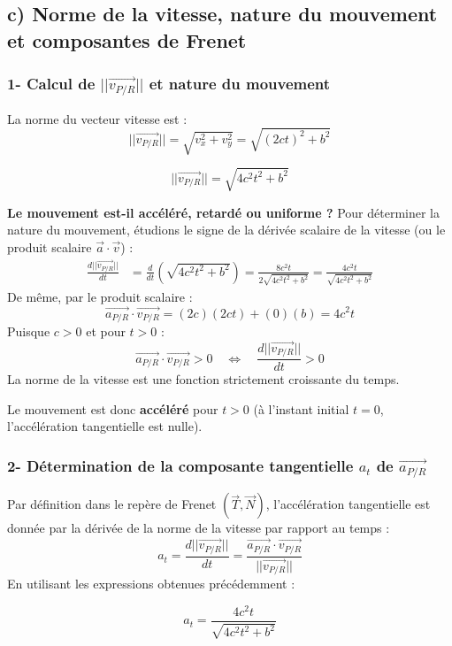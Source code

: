 \documentclass[11pt,a4paper]{article}
\begin{document}
\subsection*{c) Norme de la vitesse, nature du mouvement et composantes de Frenet}

\subsubsection*{1- Calcul de $||\vec{v_{P/R}}||$ et nature du mouvement}
La norme du vecteur vitesse est :
$$ ||\vec{v_{P/R}}|| = \sqrt{v_x^2 + v_y^2} = \sqrt{(2ct)^2 + b^2} $$
\begin{sonucbox}
$$ ||\vec{v_{P/R}}|| = \sqrt{4c^2 t^2 + b^2} $$
\end{sonucbox}

\textbf{Le mouvement est-il accéléré, retardé ou uniforme ?}
Pour déterminer la nature du mouvement, étudions le signe de la dérivée scalaire de la vitesse (ou le produit scalaire $\vec{a}\cdot\vec{v}$) :
\begin{align*}
\frac{d||\vec{v_{P/R}}||}{dt} &= \frac{d}{dt}\left(\sqrt{4c^2 t^2 + b^2}\right) = \frac{8c^2 t}{2\sqrt{4c^2 t^2 + b^2}} = \frac{4c^2 t}{\sqrt{4c^2 t^2 + b^2}}
\end{align*}
De même, par le produit scalaire :
$$ \vec{a_{P/R}} \cdot \vec{v_{P/R}} = (2c)(2ct) + (0)(b) = 4c^2 t $$
Puisque $c > 0$ et pour $t > 0$ :
$$ \vec{a_{P/R}} \cdot \vec{v_{P/R}} > 0 \quad \Longleftrightarrow \quad \frac{d||\vec{v_{P/R}}||}{dt} > 0 $$
La norme de la vitesse est une fonction strictement croissante du temps.
\begin{sonucbox}
Le mouvement est donc \textbf{accéléré} pour $t > 0$ (à l'instant initial $t=0$, l'accélération tangentielle est nulle).
\end{sonucbox}

\subsubsection*{2- Détermination de la composante tangentielle $a_t$ de $\vec{a_{P/R}}$}
Par définition dans le repère de Frenet $(\vec{T}, \vec{N})$, l'accélération tangentielle est donnée par la dérivée de la norme de la vitesse par rapport au temps :
$$ a_t = \frac{d||\vec{v_{P/R}}||}{dt} = \frac{\vec{a_{P/R}} \cdot \vec{v_{P/R}}}{||\vec{v_{P/R}}||} $$
En utilisant les expressions obtenues précédemment :
\begin{sonucbox}
$$ a_t = \frac{4c^2 t}{\sqrt{4c^2 t^2 + b^2}} $$
\end{sonucbox}
\end{document}
